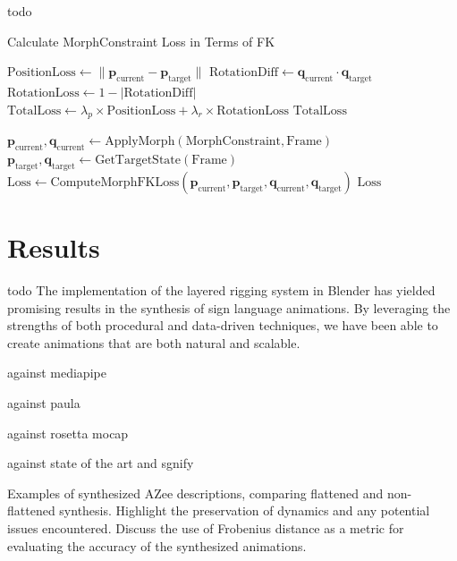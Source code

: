 \documentclass[../../main.tex]{subfiles}
\begin{document}
todo
\begin{algorithm}
    \caption{Calculate MorphConstraint Loss in Terms of FK}
    \begin{algorithmic}[1]
        \label{alg:morph_constraint_loss}
        \State $\text{PositionLoss} \gets \|\mathbf{p}_{\text{current}} - \mathbf{p}_{\text{target}}\|$
        \State $\text{RotationDiff} \gets \mathbf{q}_{\text{current}} \cdot \mathbf{q}_{\text{target}}$
        \State $\text{RotationLoss} \gets 1 - |\text{RotationDiff}|$
        \State $\text{TotalLoss} \gets \lambda_p \times \text{PositionLoss} + \lambda_r \times \text{RotationLoss}$
        \State \Return $\text{TotalLoss}$
    \EndProcedure
    
        \State $\mathbf{p}_{\text{current}}, \mathbf{q}_{\text{current}} \gets \text{ApplyMorph}(\text{MorphConstraint}, \text{Frame})$
        \State $\mathbf{p}_{\text{target}}, \mathbf{q}_{\text{target}} \gets \text{GetTargetState}(\text{Frame})$
        \State $\text{Loss} \gets \text{ComputeMorphFKLoss}(\mathbf{p}_{\text{current}}, \mathbf{p}_{\text{target}}, \mathbf{q}_{\text{current}}, \mathbf{q}_{\text{target}})$
        \State \Return $\text{Loss}$
    \EndProcedure
    
    \end{algorithmic}
\end{algorithm}

\section{Results}
\label{sec:results}
todo The implementation of the layered rigging system in Blender has yielded promising results in the synthesis of sign language animations. By leveraging the strengths of both procedural and data-driven techniques, we have been able to create animations that are both natural and scalable.

against mediapipe 

against paula

against rosetta mocap

against state of the art and sgnify

Examples of synthesized AZee descriptions, comparing flattened and non-flattened synthesis. Highlight the preservation of dynamics and any potential issues encountered. Discuss the use of Frobenius distance as a metric for evaluating the accuracy of the synthesized animations.
\end{document}
